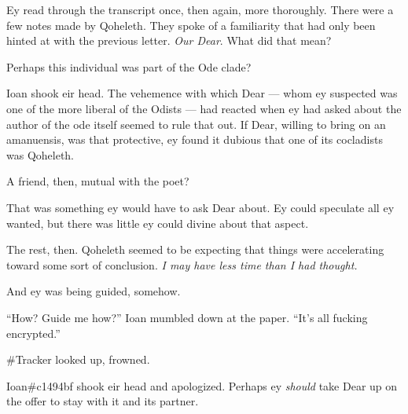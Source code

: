 Ey read through the transcript once, then again, more thoroughly. There were a few notes made by Qoheleth. They spoke of a familiarity that had only been hinted at with the previous letter. \emph{Our Dear}. What did that mean?

Perhaps this individual was part of the Ode clade?

Ioan shook eir head. The vehemence with which Dear — whom ey suspected was one of the more liberal of the Odists — had reacted when ey had asked about the author of the ode itself seemed to rule that out. If Dear, willing to bring on an amanuensis, was that protective, ey found it dubious that one of its cocladists was Qoheleth.

A friend, then, mutual with the poet?

That was something ey would have to ask Dear about. Ey could speculate all ey wanted, but there was little ey could divine about that aspect.

The rest, then. Qoheleth seemed to be expecting that things were accelerating toward some sort of conclusion. \emph{I may have less time than I had thought.}

And ey was being guided, somehow.

``How? Guide me how?'' Ioan mumbled down at the paper. ``It's all fucking encrypted.''

\#Tracker looked up, frowned.

Ioan\#c1494bf shook eir head and apologized. Perhaps ey \emph{should} take Dear up on the offer to stay with it and its partner.
